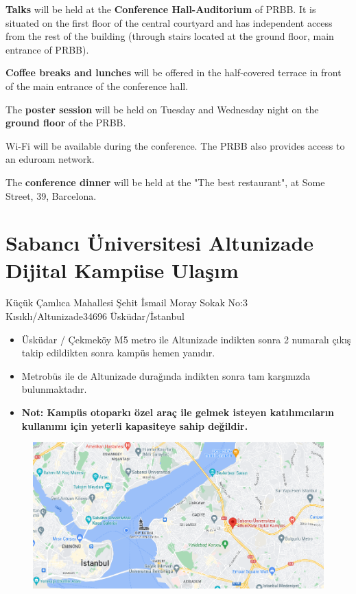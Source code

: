 \textbf{Talks} will be held at the \textbf{Conference Hall-Auditorium} of PRBB. It is situated on the first floor of the central courtyard and
has independent access from the rest of the building (through stairs located at the ground floor, main entrance of PRBB). 

\textbf{Coffee breaks and lunches} will be offered in the half-covered terrace in front of the main entrance of the conference hall.

The \textbf{poster session} will be held on Tuesday and Wednesday night on the \textbf{ground floor} of the PRBB. 

Wi-Fi will be available during the conference. The PRBB also provides access to an eduroam network.

The \textbf{conference dinner} will be held at the "The best restaurant", at Some Street, 39, Barcelona.

\section{Sabancı Üniversitesi Altunizade Dijital Kampüse Ulaşım}

Küçük Çamlıca Mahallesi Şehit İsmail Moray Sokak No:3 Kısıklı/Altunizade34696 Üsküdar/İstanbul

\begin{itemize}

	\item Üsküdar / Çekmeköy M5 metro ile Altunizade indikten sonra 2 numaralı çıkış takip edildikten sonra kampüs hemen yanıdır.
	\item Metrobüs ile de Altunizade durağında indikten sonra tam karşınızda bulunmaktadır.
	\item \textbf{Not: Kampüs otoparkı özel araç ile gelmek isteyen katılımcıların kullanımı için yeterli kapasiteye sahip değildir.}
	
\end{itemize}

\begin{figure}
\centering
\includegraphics[width=\textwidth]{altunizade_2.png}
\end{figure}


